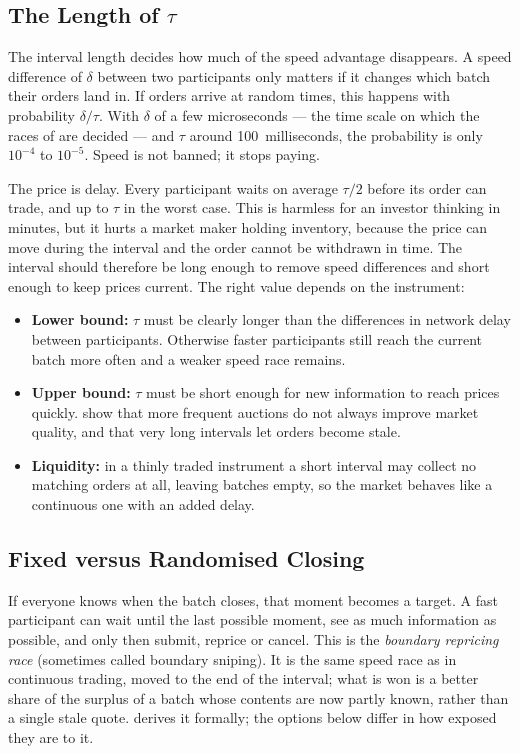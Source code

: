 \subsection{The Length of \texorpdfstring{$\tau$}{tau}}

The interval length decides how much of the speed advantage disappears. A
speed difference of $\delta$ between two participants only matters if it
changes which batch their orders land in. If orders arrive at random times,
this happens with probability $\delta/\tau$. With $\delta$ of a few
microseconds --- the time scale on which the races of
\citet{aquilina2022quantifying} are decided --- and $\tau$ around
100~milliseconds, the probability is only $10^{-4}$ to $10^{-5}$. Speed is not
banned; it stops paying.

The price is delay. Every participant waits on average $\tau/2$ before its
order can trade, and up to $\tau$ in the worst case. This is harmless for an
investor thinking in minutes, but it hurts a market maker holding inventory,
because the price can move during the interval and the order cannot be
withdrawn in time. The interval should therefore be long enough to remove
speed differences and short enough to keep prices current. The right value
depends on the instrument:

\begin{itemize}
  \item \textbf{Lower bound:} $\tau$ must be clearly longer than the
  differences in network delay between participants. Otherwise faster
  participants still reach the current batch more often and a weaker speed
  race remains.
  \item \textbf{Upper bound:} $\tau$ must be short enough for new information
  to reach prices quickly. \citet{zoican2021speed} show that more frequent
  auctions do not always improve market quality, and that very long intervals
  let orders become stale.
  \item \textbf{Liquidity:} in a thinly traded instrument a short interval may
  collect no matching orders at all, leaving batches empty, so the market
  behaves like a continuous one with an added delay.
\end{itemize}

\subsection{Fixed versus Randomised Closing}

If everyone knows when the batch closes, that moment becomes a target. A fast
participant can wait until the last possible moment, see as much information
as possible, and only then submit, reprice or cancel. This is the
\emph{boundary repricing race} (sometimes called boundary sniping). It is the
same speed race as in continuous trading, moved to the end of the interval;
what is won is a better share of the surplus of a batch whose contents are
now partly known, rather than a single stale quote. 
derives it formally; the options below differ in how exposed they are to it.

